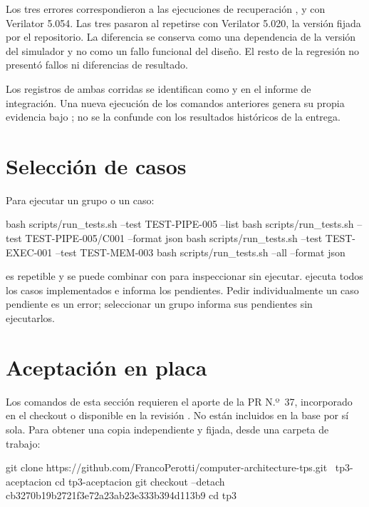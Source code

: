 Los tres errores correspondieron a las ejecuciones de recuperación
,  y  con Verilator 5.054. Las
tres pasaron al repetirse con Verilator 5.020, la versión fijada por el
repositorio. La diferencia se conserva como una dependencia de la versión del
simulador y no como un fallo funcional del diseño. El resto de la regresión no
presentó fallos ni diferencias de resultado.

Los registros de ambas corridas se identifican como  y
 en el informe de integración. Una nueva ejecución de los
comandos anteriores genera su propia evidencia bajo ; no
se la confunde con los resultados históricos de la entrega.

\section{Selección de casos}

Para ejecutar un grupo o un caso:

\begin{codebox}[language=bash]
bash scripts/run_tests.sh --test TEST-PIPE-005 --list
bash scripts/run_tests.sh --test TEST-PIPE-005/C001 --format json
bash scripts/run_tests.sh --test TEST-EXEC-001 --test TEST-MEM-003
bash scripts/run_tests.sh --all --format json
\end{codebox}

 es repetible y se puede combinar con  para
inspeccionar sin ejecutar.  ejecuta todos los casos implementados e
informa los pendientes. Pedir individualmente un caso pendiente es un error;
seleccionar un grupo informa sus pendientes sin ejecutarlos.

\section{Aceptación en placa}

Los comandos de esta sección requieren el aporte de la PR N.º~37, incorporado
en el checkout o disponible en la revisión . No están
incluidos en la base  por sí sola. Para obtener una copia
independiente y fijada, desde una carpeta de trabajo:

\begin{codebox}[language=bash]
git clone https://github.com/FrancoPerotti/computer-architecture-tps.git \
  tp3-aceptacion
cd tp3-aceptacion
git checkout --detach cb3270b19b2721f3e72a23ab23e333b394d113b9
cd tp3
\end{codebox}

